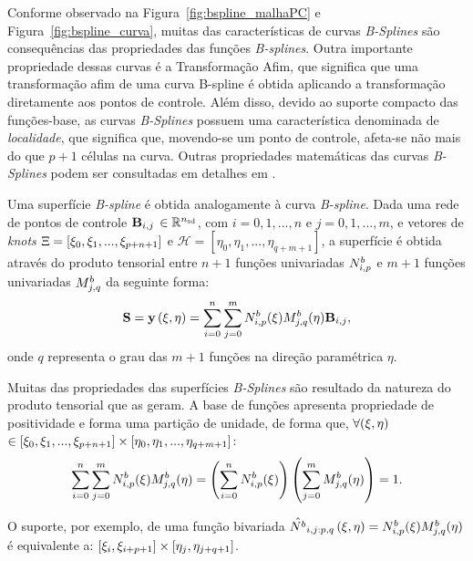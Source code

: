 Conforme observado na Figura~\ref{fig:bspline_malhaPC} e  Figura~\ref{fig:bspline_curva}, muitas das características de curvas \textit{B-Splines} são consequências das propriedades das funções \textit{B-splines}. Outra importante propriedade dessas curvas é a Transformação Afim, que significa que uma transformação afim de uma curva B-spline é obtida aplicando a transformação diretamente aos pontos de controle. Além disso, devido ao suporte compacto das funções-base, as curvas \textit{B-Splines} possuem uma característica denominada de \textit{localidade}, que significa que, movendo-se um ponto de controle, afeta-se não mais do que $p+1$ células na curva. Outras propriedades matemáticas das curvas \textit{B-Splines} podem ser consultadas em detalhes em .

Uma superfície \textit{B-spline} é obtida analogamente à curva \textit{B-spline}. Dada uma rede de pontos de controle $\mathbf{B}_{i,j}$ $\in \mathbb{R}^{{n_{\mathrm{sd}}}}$, com $i = 0,1,...,n$ e $j = 0,1,..., m$, e vetores de \textit{knots} $\Xi = \left[\xi_{0},\xi_{1},...,\xi_{p+n+1}\right]$ e $\mathcal{H} = \left[\eta_{0},\eta_{1},...,\eta_{q+m+1}\right]$, a superfície é obtida através do produto tensorial entre $n+1$ funções univariadas $N^b_{i,p}$ e $m+1$ funções univariadas $M^b_{j,q}$ da seguinte forma:
\begin{align}
\mathbf{S} = \mathbf{y}\left(\xi,\eta\right)  = \sum_{i=0}^{n}\sum_{j=0}^{m}N^b_{i,p}(\xi)M^b_{j,q}(\eta)\mathbf{B}_{i,j},
\end{align}
\noindent onde $q$ representa o grau das $m+1$ funções na direção paramétrica $\eta$. 

Muitas das propriedades das superfícies \textit{B-Splines} são resultado da natureza do produto tensorial que as geram. A base de funções apresenta propriedade de positividade e forma uma partição de unidade, de forma que, $\forall(\xi,\eta)$ $\in \left[\xi_{0},\xi_{1},...,\xi_{p+n+1}\right] \times  \left[\eta_{0},\eta_{1},...,\eta_{q+m+1}\right]$:
\begin{align}
 \sum_{i=0}^{n}\sum_{j=0}^{m}N^b_{i,p}(\xi)M^b_{j,q}(\eta) = \left(\sum_{i=0}^{n} N^b_{i,p}(\xi)\right) \left(\sum_{j=0}^{m} M^b_{j,q}(\eta)\right) = 1.
\end{align}

O suporte, por exemplo, de uma função bivariada $\hat{N^b}_{i,j:p,q}\left(\xi,\eta\right) = N^b_{i,p}(\xi)M^b_{j,q}(\eta)$ é equivalente a: $\left[\xi_{i},\xi_{i+p+1}\right]\times\left[\eta_{j},\eta_{j+q+1}\right]$.


